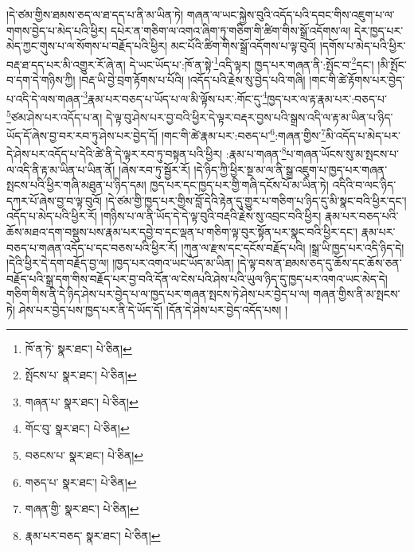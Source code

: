 །དེ་ཙམ་གྱིས་ཐམས་ཅད་ལ་ཐ་དད་པ་ནི་མ་ཡིན་ཏེ། གཞན་ལ་ཡང་སྐྱེས་བུའི་འདོད་པའི་དབང་གིས་འཇུག་པ་ལ་གགས་བྱེད་པ་མེད་པའི་ཕྱིར། དཔེར་ན་གཅིག་ལ་འགའ་ཞིག་ཏུ་གཅིག་གི་ཚིག་གིས་སྒྲོ་འདོགས་ལ། དེར་ཁྱད་པར་མེད་ཀྱང་གུས་པ་ལ་སོགས་པ་བརྗོད་པའི་ཕྱིར། མང་པོའི་ཚིག་གིས་སྒྲོ་འདོགས་པ་ལྟ་བུའོ། །དགོས་པ་མེད་པའི་ཕྱིར་བརྡ་ཐ་དད་པར་མི་འགྱུར་རོ་ཞེ་ན། དེ་ཡང་ཡོད་པ་:ཁོ་ན་སྟེ་\footnote{ཁོ་ན་ཏེ་  སྣར་ཐང་།  པེ་ཅིན། }འདི་ལྟར། ཁྱད་པར་གཞན་ནི་:སྤོང་བ་\footnote{སྤོངས་པ་  སྣར་ཐང་།  པེ་ཅིན། }དང་། །མི་སྤོང་བ་དག་དེ་གཉིས་ཀྱི། །བརྡ་ཡི་བྱེ་བྲག་རྟོགས་པ་པོའི། །འདོད་པའི་རྗེས་སུ་བྱེད་པའི་གཞི། །གང་གི་ཚེ་རྟོགས་པར་བྱེད་པ་འདི་དེ་ལས་གཞན་\footnote{གཞན་པ་  སྣར་ཐང་།  པེ་ཅིན། }རྣམ་པར་བཅད་པ་ཡོད་པ་ལ་མི་ལྟོས་པར་:གོང་དུ་\footnote{གོང་བུ་  སྣར་ཐང་།  པེ་ཅིན། }ཁྱད་པར་ལ་རྟ་རྣམ་པར་:བཅད་པ་\footnote{བཅངས་པ་  སྣར་ཐང་།  པེ་ཅིན། }ཙམ་ཤེས་པར་འདོད་པ་ན། དེ་ལྟ་བུ་ཤེས་པར་བྱ་བའི་ཕྱིར་དེ་ལྟར་བརྡར་བྱས་པའི་སྒྲས་འདི་ལ་རྟ་མ་ཡིན་པ་ཉིད་ཡོད་དོ་ཞེས་བྱ་བར་རབ་ཏུ་ཤེས་པར་བྱེད་དོ། །གང་གི་ཚེ་རྣམ་པར་:བཅད་པ་\footnote{གཅད་པ་  སྣར་ཐང་།  པེ་ཅིན། }:གཞན་གྱིས་\footnote{གཞན་གྱི་  སྣར་ཐང་།  པེ་ཅིན། }མི་འདོད་པ་མེད་པར་དེ་ཤེས་པར་འདོད་པ་དེའི་ཚེ་ནི་དེ་ལྟར་རབ་ཏུ་བསྟན་པའི་ཕྱིར། :རྣམ་པ་གཞན་\footnote{རྣམ་པར་བཅད་  སྣར་ཐང་།  པེ་ཅིན། }པ་གཞན་ཡོངས་སུ་མ་སྤངས་པ་ལ་འདི་ནི་རྟ་མ་ཡིན་པ་ཡིན་ནོ། །ཞེས་རབ་ཏུ་སྦྱོར་རོ། །དེ་ཉིད་ཀྱི་ཕྱིར་སྔ་མ་ལ་ནི་སྒྲ་འཇུག་པ་ཁྱད་པར་གཞན་སྤངས་པའི་ཕྱིར་གཞི་མཐུན་པ་ཉིད་དམ། ཁྱད་པར་དང་ཁྱད་པར་གྱི་གཞི་དངོས་པོ་མ་ཡིན་ཏེ། འདིའི་བ་ལང་ཉིད་དཀར་པོ་ཞེས་བྱ་བ་ལྟ་བུའོ། །དེ་ཙམ་གྱི་ཁྱད་པར་གྱིས་བློ་དེའི་རྟེན་དུ་གྱུར་པ་གཅིག་པ་ཉིད་དུ་མི་སྣང་བའི་ཕྱིར་དང་། འདོད་པ་མེད་པའི་ཕྱིར་རོ། །གཉིས་པ་ལ་ནི་ཡོད་དེ་དེ་ལྟ་བུའི་བརྡའི་རྗེས་སུ་འབྲང་བའི་ཕྱིར། རྣམ་པར་བཅད་པའི་ཆོས་མཐའ་དག་བསྡུས་པས་རྣམ་པར་དབྱེ་བ་དང་ལྡན་པ་གཅིག་ལྟ་བུར་སྟོན་པར་སྣང་བའི་ཕྱིར་དང་། རྣམ་པར་བཅད་པ་གཞན་འདོད་པ་དང་བཅས་པའི་ཕྱིར་རོ། །ཀུན་ལ་རྫས་དང་དངོས་བརྗོད་པའི། །སྒྲ་ཡི་ཁྱད་པར་འདི་ཉིད་དེ། །དེའི་ཕྱིར་དེ་དག་བརྗོད་བྱ་ལ། །ཁྱད་པར་འགའ་ཡང་ཡོད་མ་ཡིན། །དེ་ལྟ་བས་ན་ཐམས་ཅད་དུ་ཆོས་དང་ཆོས་ཅན་བརྗོད་པའི་སྒྲ་དག་གིས་བརྗོད་པར་བྱ་བའི་དོན་ལ་ངེས་པའི་ཤེས་པའི་ཡུལ་ཉིད་དུ་ཁྱད་པར་འགའ་ཡང་མེད་དེ། གཅིག་གིས་ནི་དེ་ཉིད་ཤེས་པར་བྱེད་པ་ལ་ཁྱད་པར་གཞན་སྤངས་ཏེ་ཤེས་པར་བྱེད་པ་ལ། གཞན་གྱིས་ནི་མ་སྤངས་ཏེ། ཤེས་པར་བྱེད་པས་ཁྱད་པར་ནི་དེ་ཡོད་དོ། །དོན་དེ་ཤེས་པར་བྱེད་འདོད་པས། །
